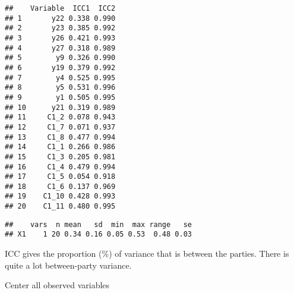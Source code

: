 \documentclass[
]{article}
\newenvironment{Shaded}{\begin{snugshade}}{\end{snugshade}}
\newcommand{\CommentTok}[1]{\textcolor[rgb]{0.56,0.35,0.01}{\textit{#1}}}
\newcommand{\DataTypeTok}[1]{\textcolor[rgb]{0.13,0.29,0.53}{#1}}
\newcommand{\DecValTok}[1]{\textcolor[rgb]{0.00,0.00,0.81}{#1}}
\newcommand{\KeywordTok}[1]{\textcolor[rgb]{0.13,0.29,0.53}{\textbf{#1}}}
\newcommand{\NormalTok}[1]{#1}
\newcommand{\OperatorTok}[1]{\textcolor[rgb]{0.81,0.36,0.00}{\textbf{#1}}}
\newcommand{\StringTok}[1]{\textcolor[rgb]{0.31,0.60,0.02}{#1}}
\begin{document}
\begin{verbatim}
##    Variable  ICC1  ICC2
## 1       y22 0.338 0.990
## 2       y23 0.385 0.992
## 3       y26 0.421 0.993
## 4       y27 0.318 0.989
## 5        y9 0.326 0.990
## 6       y19 0.379 0.992
## 7        y4 0.525 0.995
## 8        y5 0.531 0.996
## 9        y1 0.505 0.995
## 10      y21 0.319 0.989
## 11     C1_2 0.078 0.943
## 12     C1_7 0.071 0.937
## 13     C1_8 0.477 0.994
## 14     C1_1 0.266 0.986
## 15     C1_3 0.205 0.981
## 16     C1_4 0.479 0.994
## 17     C1_5 0.054 0.918
## 18     C1_6 0.137 0.969
## 19    C1_10 0.428 0.993
## 20    C1_11 0.480 0.995
\end{verbatim}

\begin{Shaded}
\end{Shaded}

\begin{verbatim}
##    vars  n mean   sd  min  max range   se
## X1    1 20 0.34 0.16 0.05 0.53  0.48 0.03
\end{verbatim}

\begin{Shaded}
\end{Shaded}

ICC gives the proportion (\%) of variance that is between the parties.
There is quite a lot between-party variance.

Center all observed variables
\end{document}
